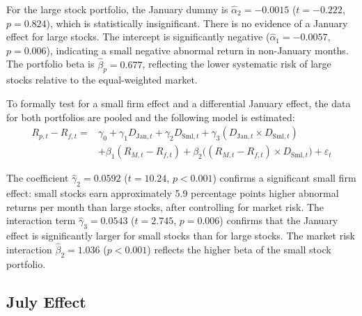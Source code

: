 \documentclass[11pt, a4paper]{article}
\begin{document}
For the large stock portfolio, the January dummy is \(\hat{\alpha}_2 = -0.0015\) (\(t = -0.222\), \(p = 0.824\)), which is statistically insignificant. There is no evidence of a January effect for large stocks. The intercept is significantly negative (\(\hat{\alpha}_1 = -0.0057\), \(p = 0.006\)), indicating a small negative abnormal return in non-January months. The portfolio beta is \(\hat{\beta}_p = 0.677\), reflecting the lower systematic risk of large stocks relative to the equal-weighted market.

\begin{table}[H]
	\centering
	
	\caption{Pooled regression for small firm and differential January effects.}\label{tab:q41_pooled}
\end{table}

To formally test for a small firm effect and a differential January effect, the data for both portfolios are pooled and the following model is estimated:
\begin{equation*}
	\begin{aligned}
		R_{p,t} - R_{f,t} ={} & \gamma_0 + \gamma_1 D_{\mathrm{Jan},t} + \gamma_2 D_{\mathrm{Sml},t} + \gamma_3 (D_{\mathrm{Jan},t} \times D_{\mathrm{Sml},t}) \\
		                      & + \beta_1 (R_{M,t} - R_{f,t}) + \beta_2 \bigl((R_{M,t} - R_{f,t}) \times D_{\mathrm{Sml},t}\bigr) + \varepsilon_t
	\end{aligned}
\end{equation*}

The coefficient \(\hat{\gamma}_2 = 0.0592\) (\(t = 10.24\), \(p < 0.001\)) confirms a significant small firm effect: small stocks earn approximately 5.9 percentage points higher abnormal returns per month than large stocks, after controlling for market risk. The interaction term \(\hat{\gamma}_3 = 0.0543\) (\(t = 2.745\), \(p = 0.006\)) confirms that the January effect is significantly larger for small stocks than for large stocks. The market risk interaction \(\hat{\beta}_2 = 1.036\) (\(p < 0.001\)) reflects the higher beta of the small stock portfolio.

\subsection{July Effect}

\begin{table}[H]
	\centering
	
	\caption{January and July effect regression for small stocks.}\label{tab:q42_small}
\end{table}
\end{document}
